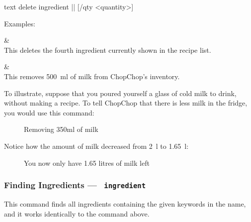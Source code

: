 	 \begin{blockofcode}{text}
		delete ingredient |\itemref{}|
			[/qty <quantity>]
	\end{blockofcode}

	Examples:
	\begin{bulletlist}
		&  \\
		  This deletes the fourth ingredient currently shown in the recipe list.

		&  \\
		  This removes \SI{500}{\milli\litre} of milk from ChopChop's inventory.
	\end{bulletlist}

	\pagebreak
	To illustrate, suppose that you poured yourself a glass of cold milk to drink, without making a recipe. To tell ChopChop that there is less milk in the fridge, you would use this command:
	\vspace{-.5em} %
	\begin{figure}[!htbp]\centering\ContinuedFloat*
		\caption{Removing 350ml of milk}
	\end{figure}
	\vspace{-2em} %

	Notice how the amount of milk decreased from \SI{2}{\litre} to \SI{1.65}{\litre}:
	\vspace{-.5em}
	\begin{figure}[!htbp]\centering\ContinuedFloat
		\caption{You now only have 1.65 litres of milk left}
	\end{figure}
	\vspace{-1.5em}












\hypertarget{FindIngredientCommand}{}
\subsubsection{Finding Ingredients — \texttt{ ingredient}}

	This command finds all ingredients containing the given keywords in the name, and it works identically to the
	\hyperlink{FindRecipeCommand}{} command above.

